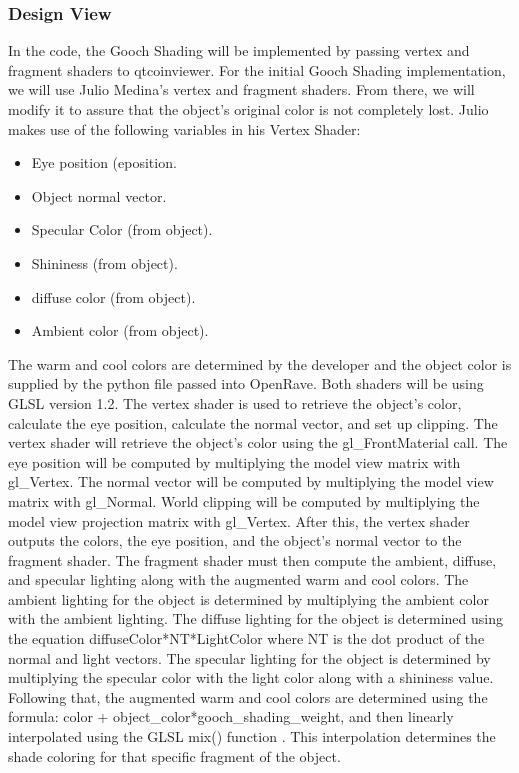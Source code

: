 ﻿\documentclass[10pt,journal,compsoc,draftclsnofoot]{IEEEtran}
\begin{document}
\begin{flushleft}
\subsubsection{Design View}
In the code, the Gooch Shading will be implemented by passing vertex and fragment shaders to qtcoinviewer.
For the initial Gooch Shading implementation, we will use Julio Medina's vertex and fragment shaders.
From there, we will modify it to assure that the object's original color is not completely lost. 
Julio makes use of the following variables in his Vertex Shader:
\begin{itemize}
\item Eye position (eposition.
\item Object normal vector.
\item Specular Color (from object).
\item Shininess (from object).
\item diffuse color (from object).
\item Ambient color (from object).
\end{itemize}

The warm and cool colors are determined by the developer and the object color is supplied by the python file passed into OpenRave.
Both shaders will be using GLSL version 1.2.
The vertex shader is used to retrieve the object's color, calculate the eye position, calculate the normal vector, and set up clipping.
The vertex shader will retrieve the object's color using the gl\_FrontMaterial call.
The eye position will be computed by multiplying the model view matrix with gl\_Vertex.
The normal vector will be computed by multiplying the model view matrix with gl\_Normal.
World clipping will be computed by multiplying the model view projection matrix with gl\_Vertex.
After this, the vertex shader outputs the colors, the eye position, and the object's normal vector to the fragment shader.
The fragment shader must then compute the ambient, diffuse, and specular lighting along with the augmented warm and cool colors.
The ambient lighting for the object is determined by multiplying the ambient color with the ambient lighting.
The diffuse lighting for the object is determined using the equation diffuseColor*NT*LightColor where NT is the dot product of the normal and light vectors.
The specular lighting for the object is determined by multiplying the specular color with the light color along with a shininess value.
Following that, the augmented warm and cool colors are determined using the formula: color + object\_color*gooch\_shading\_weight, and then linearly interpolated using the GLSL mix() function \cite{glslmix}.
This interpolation determines the shade coloring for that specific fragment of the object.


\end{flushleft}
\end{document}
